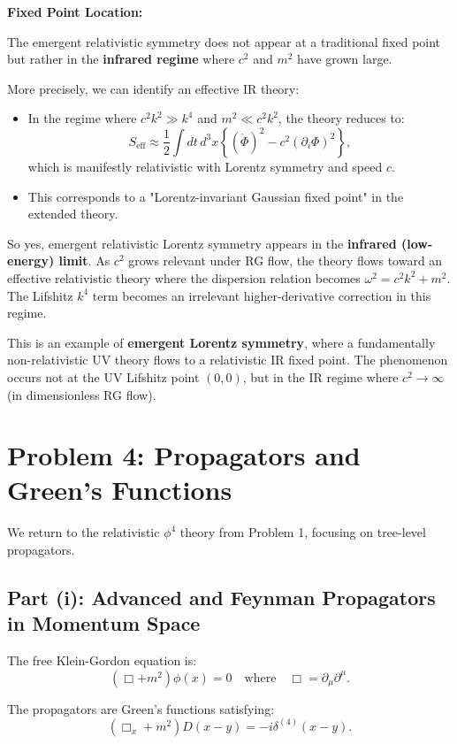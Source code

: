 \documentclass[11pt, a4paper]{article}
\newcommand{\be}{\begin{equation}}
\newcommand{\ee}{\end{equation}}
\begin{document}
\textbf{Fixed Point Location:}

The emergent relativistic symmetry does not appear at a traditional fixed point but rather in the \textbf{infrared regime} where $c^2$ and $m^2$ have grown large.

More precisely, we can identify an effective IR theory:
\begin{itemize}
    \item In the regime where $c^2 k^2 \gg k^4$ and $m^2 \ll c^2 k^2$, the theory reduces to:
    \be
    S_{\text{eff}} \approx \frac{1}{2}\int dt\,d^3x\left\{(\dot{\Phi})^2 - c^2(\partial_i\Phi)^2\right\},
    \ee
    which is manifestly relativistic with Lorentz symmetry and speed $c$.
\item This corresponds to a "Lorentz-invariant Gaussian fixed point" in the extended theory.
\end{itemize}

So yes, emergent relativistic Lorentz symmetry appears in the \textbf{infrared (low-energy) limit}. As $c^2$ grows relevant under RG flow, the theory flows toward an effective relativistic theory where the dispersion relation becomes $\omega^2 = c^2 k^2 + m^2$. The Lifshitz $k^4$ term becomes an irrelevant higher-derivative correction in this regime. 

This is an example of \textbf{emergent Lorentz symmetry}, where a fundamentally non-relativistic UV theory flows to a relativistic IR fixed point. The phenomenon occurs not at the UV Lifshitz point $(0,0)$, but in the IR regime where $c^2 \to \infty$ (in dimensionless RG flow).

\section{Problem 4: Propagators and Green's Functions}

We return to the relativistic $\phi^4$ theory from Problem 1, focusing on tree-level propagators.

\subsection{Part (i): Advanced and Feynman Propagators in Momentum Space}

The free Klein-Gordon equation is:
\be
(\Box + m^2)\phi(x) = 0 \quad \text{where} \quad \Box = \partial_\mu\partial^\mu.
\ee

The propagators are Green's functions satisfying:
\be
(\Box_x + m^2)D(x-y) = -i\delta^{(4)}(x-y).
\ee
\end{document}
